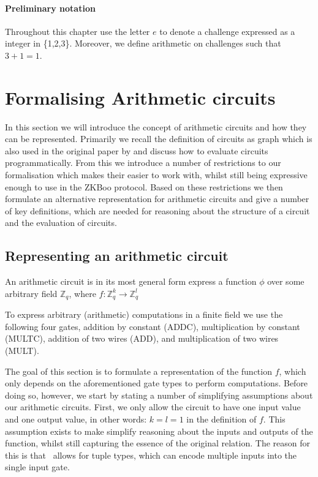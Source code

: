 \paragraph{Preliminary notation}
Throughout this chapter use the letter $e$ to denote a challenge expressed as a integer in \{1,2,3\}.
Moreover, we define arithmetic on challenges such that $3+1 = 1$.

\section{Formalising Arithmetic circuits}
\label{sec:arith_circuits}
In this section we will introduce the concept of arithmetic circuits and how they
can be represented. Primarily we recall the definition of circuits as
graph which is also used in the original paper by \citet{zkboo} and discuss how
to evaluate circuits programmatically. From this we introduce a number of
restrictions to our formalisation which makes their easier to work with, whilst
still being expressive enough to use in the ZKBoo protocol. Based on these
restrictions we then formulate an alternative representation for arithmetic
circuits and give a number of key definitions, which are needed for reasoning
about the structure of a circuit and the evaluation of circuits.

\subsection{Representing an arithmetic circuit}
\label{subsec:arith-representation}
An arithmetic circuit is in its most general form express a function $\phi$ over some
arbitrary field $\mathbb{Z}_{q}$, where $f : \mathbb{Z}_{q}^{k} \rightarrow \mathbb{Z}_{q}^{l}$

To express arbitrary (arithmetic) computations in a finite field we
use the following four gates, addition by constant (ADDC), multiplication by constant
(MULTC), addition of two wires (ADD), and multiplication of two wires (MULT).

The goal of this section is to formulate a representation of the function
$f$, which only depends on the aforementioned gate types to perform
computations. Before doing so, however, we start by stating a number of
simplifying assumptions about our arithmetic circuits. First, we only allow the
circuit to have one input value and one output value, in other words:
$k = l = 1$ in the definition of $f$.
This assumption exists to make simplify reasoning about the inputs and
outputs of the function, whilst still capturing the essence of the original
relation. The reason for this is that \easycrypt\ allows for tuple types, which can
encode multiple inputs into the single input gate.

